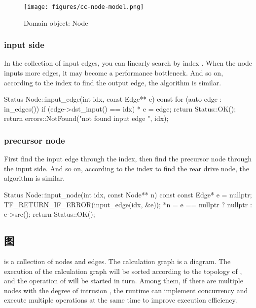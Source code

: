 \begin{content}
\begin{figure}[H]
\centering
\texttt{[image: figures/cc-node-model.png]}
\caption{Domain object: Node}
 \label{fig:cc-node-model}
\end{figure}

\subsubsection{input side}

In the collection of input edges, you can linearly search by index . When the node inputs more edges, it may become a performance bottleneck. And so on, according to the index  to find the output edge, the algorithm is similar.

\begin{leftbar}
\begin{c++}
Status Node::input_edge(int idx, const Edge** e) const {
  for (auto edge : in_edges()) {
    if (edge->dst_input() == idx) {
      * e = edge;
      return Status::OK();
    }
  }
  return errors::NotFound("not found input edge ", idx);
}
\end{c++}
\end{leftbar}

\subsubsection{precursor node}

First find the input edge through the  index, then find the precursor node through the input side. And so on, according to the index to find the rear drive node, the algorithm is similar.

\begin{leftbar}
\begin{c++}
Status Node::input_node(int idx, const Node** n) const {
  const Edge* e = nullptr;
  TF_RETURN_IF_ERROR(input_edge(idx, &e));
  *n = e == nullptr ? nullptr : e->src();
  return Status::OK();
}
\end{c++}
\end{leftbar}

\subsection{图}

 is a collection of nodes and edges. The calculation graph is a  diagram. The execution of the calculation graph will be sorted according to the topology of , and the operation of  will be started in turn. Among them, if there are multiple nodes with the degree of intrusion , the  runtime can implement concurrency and execute multiple  operations at the same time to improve execution efficiency.


\end{content}
